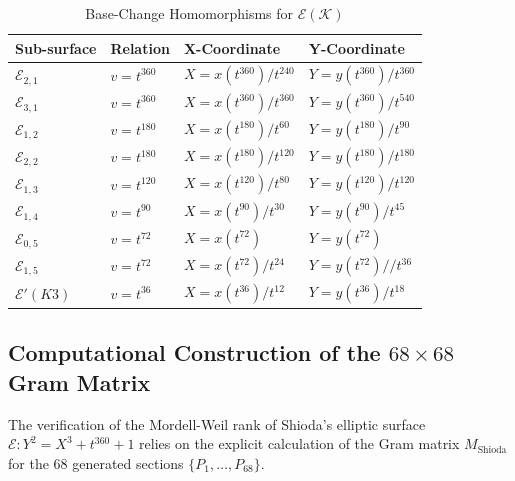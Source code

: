 \documentclass[11pt]{amsart}
\begin{document}
\begin{table}[htbp]
	\centering
	\caption{Base-Change Homomorphisms for $\mathcal{E}(\mathcal{K})$}
	\label{tab:homomorphisms}
	\begin{tabular}{@{}llll@{}}
		\toprule
		\textbf{Sub-surface} & \textbf{Relation} & \textbf{X-Coordinate} & \textbf{Y-Coordinate} \\ \midrule
		$\mathcal{E}_{2,1}$ & $v = t^{360}$ & $X = x(t^{360})/t^{240}$ & $Y = y(t^{360})/t^{360}$ \\
		$\mathcal{E}_{3,1}$ & $v = t^{360}$ & $X = x(t^{360})/t^{360}$ & $Y = y(t^{360})/t^{540}$ \\
		$\mathcal{E}_{1,2}$ & $v = t^{180}$ & $X = x(t^{180})/t^{60}$ & $Y = y(t^{180})/t^{90}$ \\
		$\mathcal{E}_{2,2}$ & $v = t^{180}$ & $X = x(t^{180})/t^{120}$ & $Y = y(t^{180})/t^{180}$ \\
		$\mathcal{E}_{1,3}$ & $v = t^{120}$ & $X = x(t^{120})/t^{80}$ & $Y = y(t^{120})/t^{120}$ \\
		$\mathcal{E}_{1,4}$ & $v = t^{90}$ & $X = x(t^{90})/t^{30}$ & $Y = y(t^{90})/t^{45}$ \\
		$\mathcal{E}_{0,5}$ & $v = t^{72}$ & $X = x(t^{72})$ & $Y = y(t^{72})$ \\
		$\mathcal{E}_{1,5}$ & $v = t^{72}$ & $X = x(t^{72})/t^{24}$ & $Y = y(t^{72})//t^{36}$ \\
		$\mathcal{E}' (K3)$ & $v = t^{36}$ & $X = x(t^{36})/t^{12}$ & $Y = y(t^{36})/t^{18}$ \\ \bottomrule
	\end{tabular}
	\label{Tab2}
\end{table}




\subsection{Computational Construction of the $68 \times 68$ Gram Matrix}

The verification of the Mordell-Weil rank of Shioda's elliptic surface $\mathcal{E}: Y^2 = X^3 + t^{360} + 1$ relies on the explicit calculation of the Gram matrix $M_{\text{Shioda}}$ for the 68 generated sections $\{P_1, \dots, P_{68}\}$. 
\end{document}
